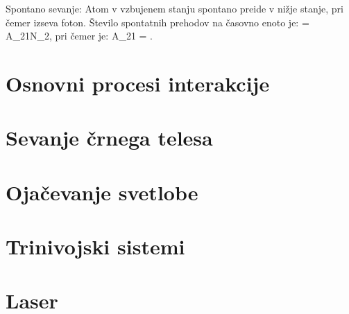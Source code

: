 Spontano sevanje: Atom v vzbujenem stanju spontano preide v nižje stanje, pri čemer izseva
foton. Število spontatnih prehodov na časovno enoto je:
\beq
{} = A_{21}N_2,
\eeq
pri čemer je:
\beq
A_{21} = .
\eeq














\section{Osnovni procesi interakcije}
\section{Sevanje črnega telesa}
\section{Ojačevanje svetlobe}
\section{Trinivojski sistemi}
\section{Laser}

